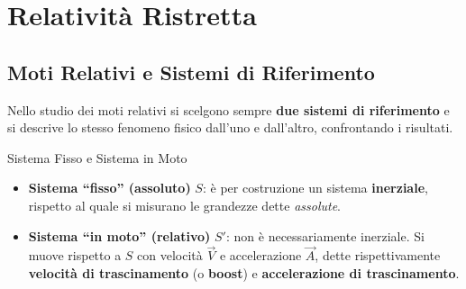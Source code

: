 \chapter{Relatività Ristretta}

\section{Moti Relativi e Sistemi di Riferimento}

Nello studio dei moti relativi si scelgono sempre \textbf{due sistemi di riferimento} e si descrive lo stesso fenomeno fisico dall'uno e dall'altro, confrontando i risultati.

\begin{definizione}{Sistema Fisso e Sistema in Moto}
\begin{itemize}[leftmargin=1.4em]
    \item \textbf{Sistema ``fisso'' (assoluto)} $S$: è per costruzione un sistema \textbf{inerziale}, rispetto al quale si misurano le grandezze dette \emph{assolute}.
    \item \textbf{Sistema ``in moto'' (relativo)} $S'$: non è necessariamente inerziale. Si muove rispetto a $S$ con velocità $\vec{V}$ e accelerazione $\vec{A}$, dette rispettivamente \textbf{velocità di trascinamento} (o \textbf{boost}) e \textbf{accelerazione di trascinamento}.
\end{itemize}
\end{definizione}

